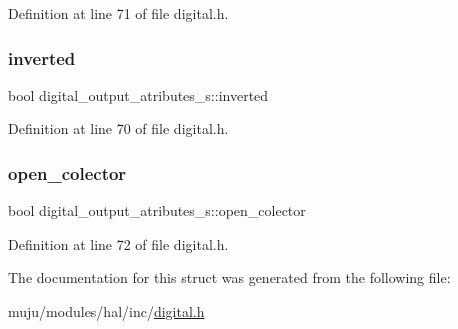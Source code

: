 Definition at line 71 of file digital.\+h.

\mbox{\label{structdigital__output__atributes__s_a4709cb6194851caa2437098537dea3d5}} 
\subsubsection{\texorpdfstring{inverted}{inverted}}
{\footnotesize\ttfamily bool digital\+\_\+output\+\_\+atributes\+\_\+s\+::inverted}



Definition at line 70 of file digital.\+h.

\mbox{\label{structdigital__output__atributes__s_aa0bdb62f77c81215ddaa1bf679c23796}} 
\subsubsection{\texorpdfstring{open\+\_\+colector}{open\_colector}}
{\footnotesize\ttfamily bool digital\+\_\+output\+\_\+atributes\+\_\+s\+::open\+\_\+colector}



Definition at line 72 of file digital.\+h.



The documentation for this struct was generated from the following file\+:\begin{DoxyCompactItemize}
\item 
muju/modules/hal/inc/\hyperlink{muju_2modules_2hal_2inc_2digital_8h}{digital.\+h}\end{DoxyCompactItemize}
